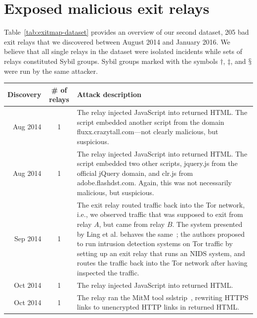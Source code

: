 \appendix

\section{Exposed malicious exit relays}
\label{sec:malicious-relays}
Table~\ref{tab:exitmap-dataset} provides an overview of our second dataset, 205
bad exit relays that we discovered between August 2014 and January 2016.  We
believe that all single relays in the dataset were isolated incidents while sets
of relays constituted Sybil groups.  Sybil groups marked with the symbols
$\dagger$, $\ddagger$, and $\mathsection$ were run by the same attacker.


\begin{table}
\small
\centering
\begin{tabularx}{\textwidth}{r c X}
\hline
\textbf{Discovery} & \textbf{\# of relays} & \textbf{Attack description} \\
\hline
Aug 2014 & 1 & The relay injected JavaScript into returned HTML.  The script
embedded another script from the domain fluxx.crazytall.com---not clearly
malicious, but suspicious. \\

Aug 2014 & 1 & The relay injected JavaScript into returned HTML.  The script
embedded two other scripts, jquery.js from the official jQuery domain, and
clr.js from adobe.flashdst.com.  Again, this was not necessarily malicious, but
suspicious. \\

Sep 2014 & 1 & The exit relay routed traffic back into the Tor network, i.e., we
observed traffic that was supposed to exit from relay $A$, but came from relay
$B$.  The system presented by Ling et al. behaves the same~\cite{Ling2015a};
the authors proposed to run intrusion detection systems on Tor traffic by
setting up an exit relay that runs an NIDS system, and routes the traffic back
into the Tor network after having inspected the traffic. \\

Oct 2014 & 1 & The relay injected JavaScript into returned HTML. \\

Oct 2014 & 1 & The relay ran the MitM tool sslstrip~\cite{sslstrip}, rewriting
HTTPS links to unencrypted HTTP links in returned HTML. \\


\end{tabularx}
\end{table}
